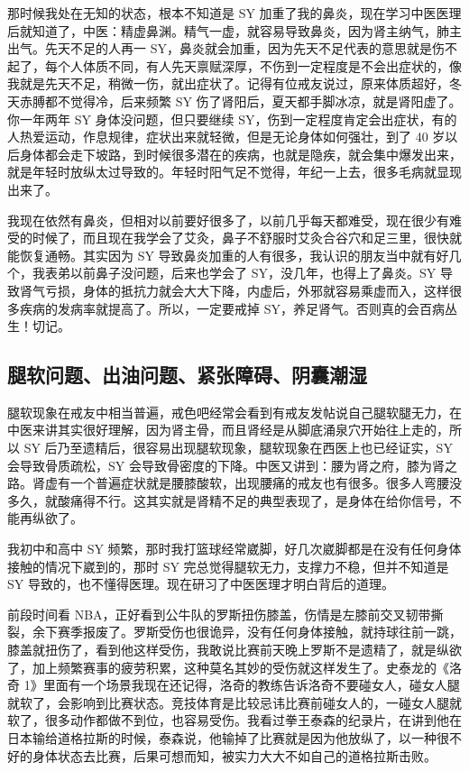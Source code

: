 \documentclass[fontset=founder]{ctexart}
\begin{document}
那时候我处在无知的状态，根本不知道是 SY 加重了我的鼻炎，现在学习中医医理后就知道了，中医：精虚鼻渊。精气一虚，就容易导致鼻炎，因为肾主纳气，肺主出气。先天不足的人再一 SY，鼻炎就会加重，因为先天不足代表的意思就是伤不起了，每个人体质不同，有人先天禀赋深厚，不伤到一定程度是不会出症状的，像我就是先天不足，稍微一伤，就出症状了。记得有位戒友说过，原来体质超好，冬天赤膊都不觉得冷，后来频繁 SY 伤了肾阳后，夏天都手脚冰凉，就是肾阳虚了。你一年两年 SY 身体没问题，但只要继续 SY，伤到一定程度肯定会出症状，有的人热爱运动，作息规律，症状出来就轻微，但是无论身体如何强壮，到了 40 岁以后身体都会走下坡路，到时候很多潜在的疾病，也就是隐疾，就会集中爆发出来，就是年轻时放纵太过导致的。年轻时阳气足不觉得，年纪一上去，很多毛病就显现出来了。

我现在依然有鼻炎，但相对以前要好很多了，以前几乎每天都难受，现在很少有难受的时候了，而且现在我学会了艾灸，鼻子不舒服时艾灸合谷穴和足三里，很快就能恢复通畅。其实因为 SY 导致鼻炎加重的人有很多，我认识的朋友当中就有好几个，我表弟以前鼻子没问题，后来也学会了 SY，没几年，也得上了鼻炎。SY 导致肾气亏损，身体的抵抗力就会大大下降，内虚后，外邪就容易乘虚而入，这样很多疾病的发病率就提高了。所以，一定要戒掉 SY，养足肾气。否则真的会百病丛生！切记。

\subsection{腿软问题、出油问题、紧张障碍、阴囊潮湿}

腿软现象在戒友中相当普遍，戒色吧经常会看到有戒友发帖说自己腿软腿无力，在中医来讲其实很好理解，因为肾主骨，而且肾经是从脚底涌泉穴开始往上走的，所以 SY 后乃至遗精后，很容易出现腿软现象，腿软现象在西医上也已经证实，SY 会导致骨质疏松，SY 会导致骨密度的下降。中医又讲到：腰为肾之府，膝为肾之路。肾虚有一个普遍症状就是腰膝酸软，出现腰痛的戒友也有很多。很多人弯腰没多久，就酸痛得不行。这其实就是肾精不足的典型表现了，是身体在给你信号，不能再纵欲了。

我初中和高中 SY 频繁，那时我打篮球经常崴脚，好几次崴脚都是在没有任何身体接触的情况下崴到的，那时 SY 完总觉得腿软无力，支撑力不稳，但并不知道是 SY 导致的，也不懂得医理。现在研习了中医医理才明白背后的道理。

前段时间看 NBA，正好看到公牛队的罗斯扭伤膝盖，伤情是左膝前交叉韧带撕裂，余下赛季报废了。罗斯受伤也很诡异，没有任何身体接触，就持球往前一跳，膝盖就扭伤了，看到他这样受伤，我敢说比赛前天晚上罗斯不是遗精了，就是纵欲了，加上频繁赛事的疲劳积累，这种莫名其妙的受伤就这样发生了。史泰龙的《洛奇 1》里面有一个场景我现在还记得，洛奇的教练告诉洛奇不要碰女人，碰女人腿就软了，会影响到比赛状态。竞技体育是比较忌讳比赛前碰女人的，一碰女人腿就软了，很多动作都做不到位，也容易受伤。我看过拳王泰森的纪录片，在讲到他在日本输给道格拉斯的时候，泰森说，他输掉了比赛就是因为他放纵了，以一种很不好的身体状态去比赛，后果可想而知，被实力大大不如自己的道格拉斯击败。
\end{document}

